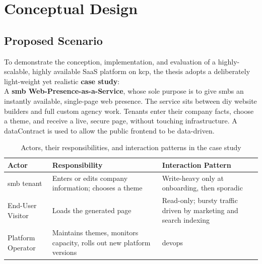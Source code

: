 \documentclass[11pt, a4paper, oneside, listof=totoc]{scrartcl}
\begin{document}
            \cleardoublepage

    \section{Conceptual Design}\label{sec:concept}

        \subsection{Proposed Scenario}\label{subsec:scenario}
            To demonstrate the conception, implementation, and evaluation of a highly-scalable, 
            highly available SaaS platform on \gls{kcp}, the thesis adopts a deliberately
            light-weight yet realistic \textbf{case study}:
            \\
            A \textbf{\gls{smb} Web-Presence-as-a-Service}, whose sole purpose is to give
            \glspl{smb} an instantly available, single-page web presence.
            The service sits between \gls{diy} website builders and full custom agency work.
            Tenants enter their company facts, choose a theme, and receive a live, secure page,
            without touching infrastructure.
            A \gls{dataContract} is used to allow the public frontend to be data-driven.
            
            \begin{table}[H]
                \centering
                \renewcommand{\arraystretch}{1.5}
                \begin{tabular}{lP{4cm}P{8cm}}
                    \toprule
                    Actor & Responsibility & Interaction Pattern \\
                    \midrule
                    \gls{smb} tenant & Enters or edits company information; chooses a theme & Write-heavy only at onboarding, then sporadic \\
                    End-User Visitor & Loads the generated page & Read-only; bursty traffic driven by marketing and search indexing \\
                    Platform Operator & Maintains themes, monitors capacity, rolls out new platform versions & \Gls{devops} \\
                    \bottomrule
                \end{tabular}
                \caption{Actors, their responsibilities, and interaction patterns in the case study}\label{tab:scenario}
            \end{table}
            
\end{document}
